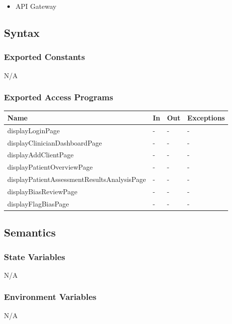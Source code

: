 \documentclass[12pt, titlepage]{article}
\begin{document}
\begin{itemize}
  \item API Gateway
\end{itemize}

\subsection{Syntax}

\subsubsection{Exported Constants}

N/A

\subsubsection{Exported Access Programs}

\begin{center}
\begin{tabular}{p{8cm} p{2cm} p{2cm} p{2cm}}
\hline
\textbf{Name} & \textbf{In} & \textbf{Out} & \textbf{Exceptions} \\
\hline
displayLoginPage & - & - & - \\
displayClinicianDashboardPage & - & - & - \\
displayAddClientPage & - & - & - \\
displayPatientOverviewPage & - & - & - \\
displayPatientAssessmentResultsAnalysisPage & - & - & - \\
displayBiasReviewPage & - & - & - \\
displayFlagBiasPage & - & - & - \\
\hline
\end{tabular}
\end{center}

\subsection{Semantics}

\subsubsection{State Variables}
N/A

\subsubsection{Environment Variables}
N/A
\end{document}
